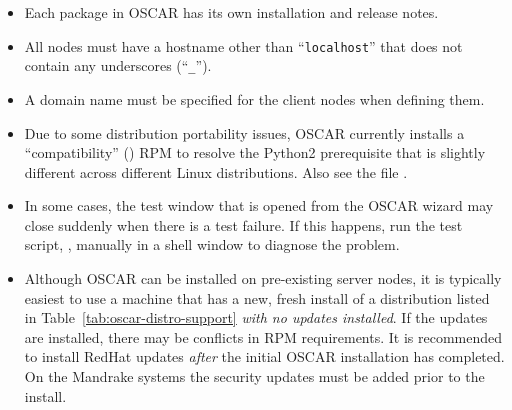 \begin{itemize}
\item Each package in OSCAR has its own installation and release
  notes.   

\item All nodes must have a hostname other than ``{\tt localhost}''
  that does not contain any underscores (``{\tt \_}'').
  
\item A domain name must be specified for the client nodes when
  defining them.

\item Due to some distribution portability issues, OSCAR currently installs
  a ``compatibility'' () RPM to resolve the
  Python2 prerequisite that is slightly different across different Linux
  distributions.  Also see the file .


\item In some cases, the test window that is opened from the 
  OSCAR wizard may close suddenly when there is a test failure. If
  this happens, run the test script, ,
  manually in a shell window to diagnose the problem.
 
\item Although OSCAR can be installed on pre-existing server nodes, it
  is typically easiest to use a machine that has a new, fresh install
\begchange
  of a distribution listed in Table~\ref{tab:oscar-distro-support}
  {\em with no updates installed}.  If the updates are installed,
  there may be conflicts in RPM requirements.  It is recommended to
  install RedHat updates {\em after} the initial OSCAR installation has
  completed.  On the Mandrake systems the security updates must be added
  prior to the install.
  

\end{itemize}
